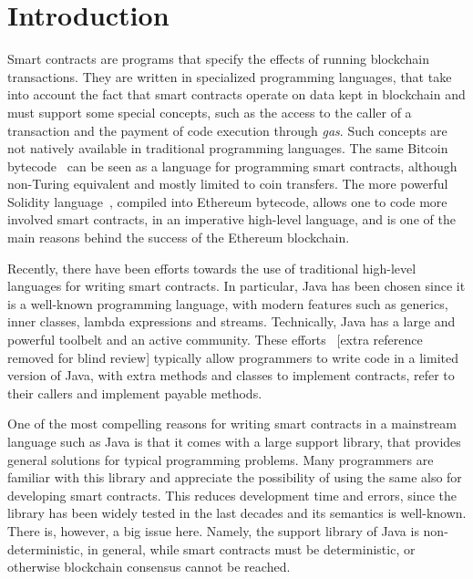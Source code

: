 \section{Introduction}\label{sec:introduction}

Smart contracts are programs that specify the effects of running blockchain transactions.
They are written in specialized programming languages, that take into account
the fact that smart contracts operate on data kept in blockchain and must
support some special concepts, such as the access to the caller of a transaction
and the payment of code execution through \emph{gas}.
Such concepts are not natively available
in traditional programming languages.
The same Bitcoin bytecode~\cite{Antonopoulos17,Nakamoto08}
can be seen as a language for programming smart contracts,
although non-Turing equivalent and mostly limited to coin transfers. The more
powerful Solidity language~\cite{AntonopoulosW18},
compiled into Ethereum bytecode, allows one to code
more involved smart contracts, in an imperative high-level language, and is
one of the main reasons behind the success of the Ethereum blockchain.

Recently, there have been efforts towards the use of traditional
high-level languages for writing smart contracts. In particular, Java has
been chosen since it is a well-known programming language,
with modern features such as generics, inner classes, lambda
expressions and streams. Technically, Java has
a large and powerful toolbelt and an active community.
These efforts~\cite{aion,aion_example_contract,neo,neo_contract}
[extra reference removed for blind review]
typically allow programmers to write code in a limited version of Java,
with extra methods and classes to implement contracts, refer to their
callers and implement payable methods.

One of the most compelling reasons for writing smart contracts
in a mainstream language such as Java is that it comes with a large
support library, that provides general solutions for typical programming problems.
Many programmers are familiar with this library and appreciate the possibility
of using the same also for developing smart contracts. This reduces
development time and errors, since the library has been widely tested
in the last decades and its semantics is well-known. There is, however, a big
issue here. Namely, the support library of Java is non-deterministic, in general,
while smart contracts must be deterministic, or otherwise blockchain consensus
cannot be reached.

